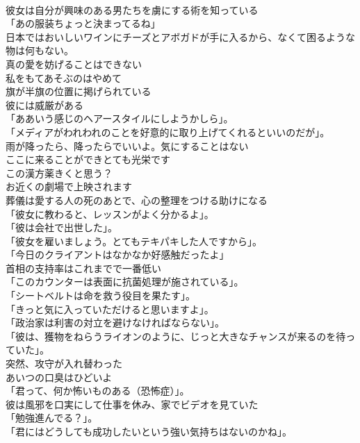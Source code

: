 \documentclass[8pt]{extreport}
\begin{document}
\begin{CJK}{UTF8}{min}
\\	彼女は自分が興味のある男たちを虜にする術を知っている	
\\	「あの服装ちょっと決まってるね」	
\\	日本ではおいしいワインにチーズとアボガドが手に入るから、なくて困るような物は何もない。	
\\	真の愛を妨げることはできない	
\\	私をもてあそぶのはやめて	
\\	旗が半旗の位置に掲げられている	
\\	彼には威厳がある	
\\	「ああいう感じのヘアースタイルにしようかしら」。	
\\	「メディアがわれわれのことを好意的に取り上げてくれるといいのだが」。	
\\	雨が降ったら、降ったらでいいよ。気にすることはない	
\\	ここに来ることができとても光栄です	
\\	この漢方薬きくと思う？	
\\	お近くの劇場で上映されます	
\\	葬儀は愛する人の死のあとで、心の整理をつける助けになる	
\\	「彼女に教わると、レッスンがよく分かるよ」。	
\\	「彼は会社で出世した」。	
\\	「彼女を雇いましょう。とてもテキパキした人ですから」。	
\\	「今日のクライアントはなかなか好感触だったよ」	
\\	首相の支持率はこれまでで一番低い	
\\	「このカウンターは表面に抗菌処理が施されている」。	
\\	「シートベルトは命を救う役目を果たす」。	
\\	「きっと気に入っていただけると思いますよ」。	
\\	「政治家は利害の対立を避けなければならない」。	
\\	「彼は、獲物をねらうライオンのように、じっと大きなチャンスが来るのを待っていた」。	
\\	突然、攻守が入れ替わった	
\\	あいつの口臭はひどいよ	
\\	「君って、何か怖いものある（恐怖症）」。	
\\	彼は風邪を口実にして仕事を休み、家でビデオを見ていた	
\\	「勉強進んでる？」。	
\\	「君にはどうしても成功したいという強い気持ちはないのかね」。	

\end{CJK}
\end{document}
